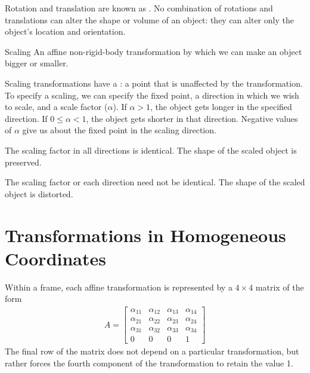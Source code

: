 \documentclass[../COS3712_Notes.tex]{subfiles}
\begin{document}
      Rotation and translation are known as .
      No combination of rotations and translations can alter the shape or volume of an object:
      they can alter only the object's location and orientation.

      \begin{definition}{Scaling}
        An affine non-rigid-body transformation by which we can make an object bigger or smaller.

        Scaling transformations have a : a point that is unaffected by the
        transformation.
        To specify a scaling, we can specify the fixed point, a direction in which we wish to scale,
        and a scale factor ($\alpha$).
        If $\alpha > 1$, the object gets longer in the specified direction.
        If $0 \leq \alpha < 1$, the object gets shorter in that direction.
        Negative values of $\alpha$ give us  about the fixed point
        in the scaling direction.
        \begin{descriptimize}
          \item[Uniform Scaling] The scaling factor in all directions is identical.
            The shape of the scaled object is preserved.
          \item[Non-uniform Scaling] The scaling factor or each direction need not be identical.
            The shape of the scaled object is distorted.
        \end{descriptimize}
      \end{definition}

    \section{Transformations in Homogeneous Coordinates}
      Within a frame, each affine transformation is represented by a $4 \times 4$ matrix of the form
      \begin{align*}
        A = \begin{bmatrix}
          \alpha_{11} & \alpha_{12} & \alpha_{13} & \alpha_{14} \\
          \alpha_{21} & \alpha_{22} & \alpha_{23} & \alpha_{24} \\
          \alpha_{31} & \alpha_{32} & \alpha_{33} & \alpha_{34} \\
          0 & 0 & 0 & 1
        \end{bmatrix}
      \end{align*}
      The final row of the matrix does not depend on a particular transformation,
      but rather forces the fourth component of the transformation to retain the value 1.
\end{document}

